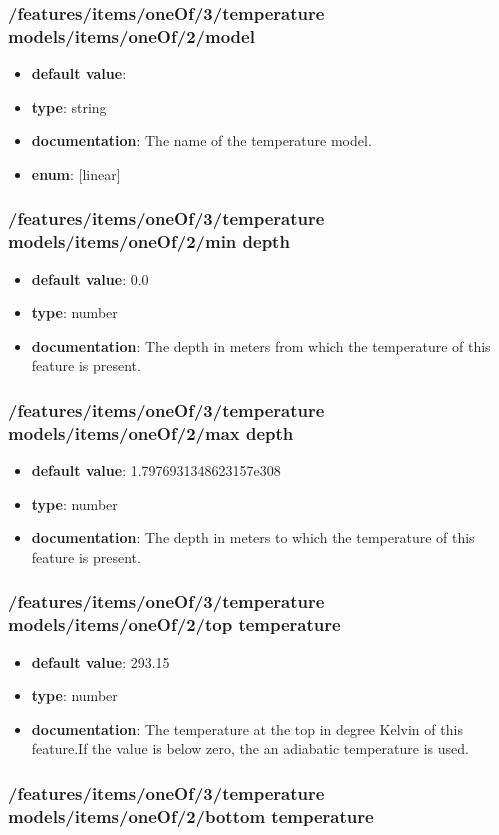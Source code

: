 \subsubsection{/features/items/oneOf/3/temperature models/items/oneOf/2/model}
\begin{itemize}\item {\bf default value}: 
\item {\bf type}: string
\item {\bf documentation}: The name of the temperature model.
\item {\bf enum}: [linear]\end{itemize}\subsubsection{/features/items/oneOf/3/temperature models/items/oneOf/2/min depth}
\begin{itemize}\item {\bf default value}: 0.0
\item {\bf type}: number
\item {\bf documentation}: The depth in meters from which the temperature of this feature is present.
\end{itemize}\subsubsection{/features/items/oneOf/3/temperature models/items/oneOf/2/max depth}
\begin{itemize}\item {\bf default value}: 1.7976931348623157e308
\item {\bf type}: number
\item {\bf documentation}: The depth in meters to which the temperature of this feature is present.
\end{itemize}\subsubsection{/features/items/oneOf/3/temperature models/items/oneOf/2/top temperature}
\begin{itemize}\item {\bf default value}: 293.15
\item {\bf type}: number
\item {\bf documentation}: The temperature at the top in degree Kelvin of this feature.If the value is below zero, the an adiabatic temperature is used.
\end{itemize}\subsubsection{/features/items/oneOf/3/temperature models/items/oneOf/2/bottom temperature}

